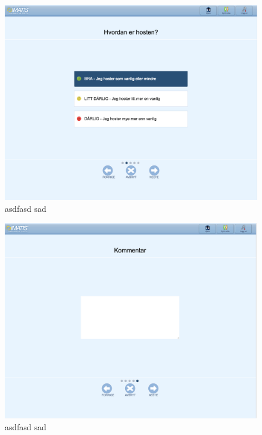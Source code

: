 \begin{figure}
\includegraphics[width=1.0\textwidth,center]{fig/helsami/tk_3_kols}
\caption{asdfasd sad}
\label{fig:helsami1}
\end{figure}

\begin{figure}
\includegraphics[width=1.0\textwidth,center]{fig/helsami/tk_6_kols}
\caption{asdfasd sad}
\label{fig:helsami1}
\end{figure}

